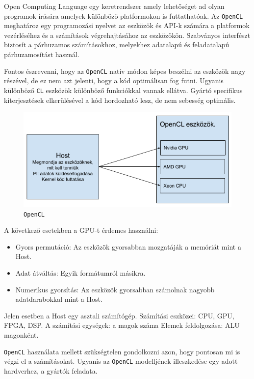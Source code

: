 
Open Computing Language egy keretrendszer amely lehetőséget ad olyan programok írására amelyek különböző platformokon is futtathatóak.
Az \texttt{OpenCL} meghatároz egy programozási nyelvet az eszközök és API-k számára a platformok vezérléséhez és a számítások végrehajtásához az eszközökön. Szabványos interfészt biztosít a párhuzamos számításokhoz, melyekhez adatalapú és feladatalapú párhuzamosítást használ.

Fontos észrevenni, hogy az \texttt{OpenCL} natív módon képes beszélni az eszközök nagy részével, de ez nem azt jelenti, hogy a kód optimálisan fog futni. Ugyanis különböző \texttt{CL} eszközök különböző funkciókkal vannak ellátva. Gyártó specifikus kiterjesztések elkerülésével a kód hordozható lesz, de nem sebesség optimális.

\begin{figure}[h!]
\centering
\includegraphics[width=\textwidth]{images/opencl.png}
\caption{\texttt{OpenCL}}
\label{fig:opencl}
\end{figure}

A következő esetekben a GPU-t érdemes használni:
\begin{itemize}
\item Gyors permutáció: Az eszközök gyorsabban mozgatáják a memóriát mint a Host.
\item Adat átváltás: Egyik formátumról másikra.
\item Numerikus gyorsítás: Az eszközök gyorsabban számolnak nagyobb adatdarabokkal mint a Host.
\end{itemize}
Jelen esetben a Host egy asztali számítógép.
Számítási eszközei: CPU, GPU, FPGA, DSP.
A számítási egységek: a magok száma
Elemek feldolgozása: ALU magonként.

\texttt{OpenCL} használata mellett szükségtelen gondolkozni azon, hogy pontosan mi is végzi el a számításokat. Ugyanis az \texttt{OpenCL} modelljének illeszkedése egy adott hardverhez, a gyártók feladata.

